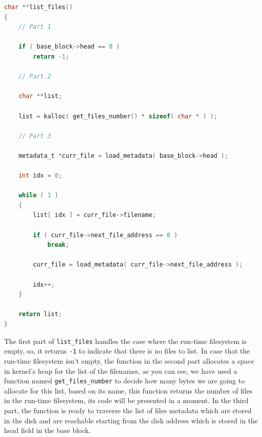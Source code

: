 \begin{lstlisting}[language=C]
char **list_files()
{
    // Part 1
    
    if ( base_block->head == 0 )
        return -1;
    
    // Part 2
    
    char **list;
    
    list = kalloc( get_files_number() * sizeof( char * ) );
    
    // Part 3
    
    metadata_t *curr_file = load_metadata( base_block->head );
    
    int idx = 0;
    
    while ( 1 )
    {
        list[ idx ] = curr_file->filename;

        if ( curr_file->next_file_address == 0 )
            break;
        
        curr_file = load_metadata( curr_file->next_file_address );
        
        idx++;
    }
    
    return list;
}
\end{lstlisting}

The first part of \lstinline!list_files! handles the case where the
run-time filesystem is empty, so, it returns \lstinline!-1! to indicate
that there is no files to list. In case that the run-time filesystem
isn't empty, the function in the second part allocates a space in
kernel's heap for the list of the filenames, as you can see, we have
used a function named \lstinline!get_files_number! to decide how many
bytes we are going to allocate for this list, based on its name, this
function returns the number of files in the run-time filesystem, its
code will be presented in a moment. In the third part, the function is
ready to traverse the list of files metadata which are stored in the
disk and are reachable starting from the disk address which is stored in
the head field in the base block.

